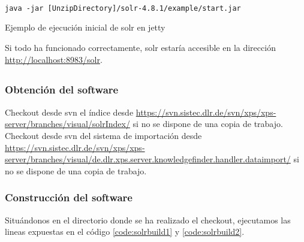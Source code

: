 \begin{listing}[H]
    \begin{verbatim}

java -jar [UnzipDirectory]/solr-4.8.1/example/start.jar
    \end{verbatim}
    \caption{Ejemplo de ejecución inicial de \gls{solr} en \gls{jetty}}
    \label{code:jettysorl}
\end{listing}


Si todo ha funcionado correctamente, \gls{solr} estaría accesible en la dirección \url{http://localhost:8983/solr}.



\subsection{}

\subsubsection{Obtención del \gls{software}}
Checkout desde \gls{svn} el índice desde \url{https://svn.sistec.dlr.de/svn/xps/xps-server/branches/visual/solrIndex/} si no se dispone de una copia de trabajo.\\

Checkout desde \gls{svn} del sistema de importación desde \url{https://svn.sistec.dlr.de/svn/xps/xps-server/branches/visual/de.dlr.xps.server.knowledgefinder.handler.dataimport/} si no se dispone de una copia de trabajo.\\

\subsubsection{Construcción del \gls{software}}
Situándonos en el directorio donde se ha realizado el checkout, ejecutamos las lineas expuestas en el código \ref{code:solrbuild1} y \ref{code:solrbuild2}.

